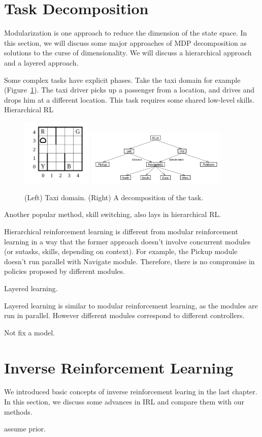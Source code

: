 \section{Task Decomposition}

Modularization is one approach to reduce the dimension of the state space. In
this section, we will discuss some major approaches of MDP decomposition as
solutions to the curse of dimensionality. We will discuss a hierarchical
approach and a layered approach.

Some complex tasks have explicit phases. Take the taxi domain for example
(Figure~\ref{fig:taxi}). The taxi driver picks up a passenger from a location,
and drives and drops him at a different location. This task requires some shared
low-level skills. Hierarchical RL

\begin{figure}[h]
\centering
\includegraphics[width=0.3\textwidth]{taxi.png}
\includegraphics[width=0.6\textwidth]{maxq.png}
\caption{(Left) Taxi domain. (Right) A decomposition of the task.}
\label{fig:taxi}
\vspace{-0.25cm}
\end{figure}

Another popular method, skill switching, also lays in hierarchical RL. 

Hierarchical reinforcement learning is different from modular reinforcement
learning in a way that the former approach doesn't involve concurrent modules
(or sutasks, skills, depending on context).
For example, the Pickup module doesn't run parallel with Navigate module.
Therefore, there is no compromise in policies proposed by different modules.

Layered learning.

Layered learning is similar to modular reinforcement learning, as the modules are
run in parallel. However different modules correspond to different controllers. 

Not fix a model.

\section{Inverse Reinforcement Learning}

We introduced basic concepts of inverse reinforcement learing in the last
chapter. In this section, we discuss some advances in IRL and compare them with
our methods.

assume prior.
